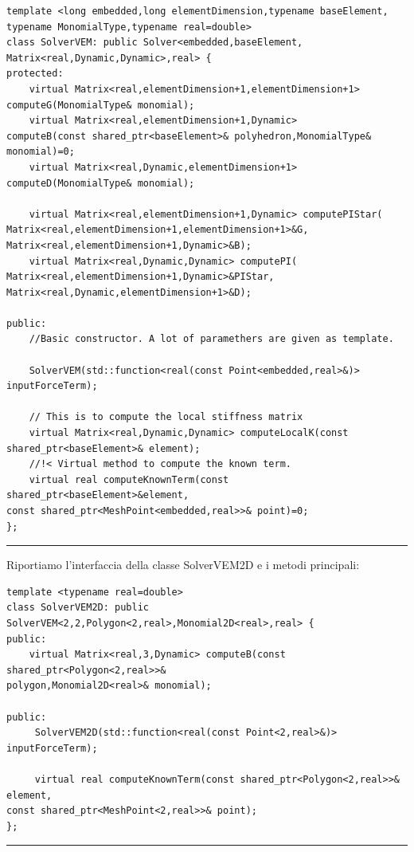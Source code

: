 \documentclass[oneside,12pt]{book}  %
\theoremstyle{plain}
\theoremstyle{definition}
\theoremstyle{remark}
\numberwithin{equation}{chapter} %
\begin{document}
\begin{verbatim}
template <long embedded,long elementDimension,typename baseElement,
typename MonomialType,typename real=double>
class SolverVEM: public Solver<embedded,baseElement,
Matrix<real,Dynamic,Dynamic>,real> {
protected:
    virtual Matrix<real,elementDimension+1,elementDimension+1> 
computeG(MonomialType& monomial);
    virtual Matrix<real,elementDimension+1,Dynamic> 
computeB(const shared_ptr<baseElement>& polyhedron,MonomialType& monomial)=0;
    virtual Matrix<real,Dynamic,elementDimension+1> 
computeD(MonomialType& monomial);
	
    virtual Matrix<real,elementDimension+1,Dynamic> computePIStar(
Matrix<real,elementDimension+1,elementDimension+1>&G,
Matrix<real,elementDimension+1,Dynamic>&B);
    virtual Matrix<real,Dynamic,Dynamic> computePI(
Matrix<real,elementDimension+1,Dynamic>&PIStar,
Matrix<real,Dynamic,elementDimension+1>&D);
	
public:
    //Basic constructor. A lot of paramethers are given as template.

    SolverVEM(std::function<real(const Point<embedded,real>&)> inputForceTerm);
	
    // This is to compute the local stiffness matrix
    virtual Matrix<real,Dynamic,Dynamic> computeLocalK(const
shared_ptr<baseElement>& element); 
    //!< Virtual method to compute the known term.
    virtual real computeKnownTerm(const shared_ptr<baseElement>&element, 
const shared_ptr<MeshPoint<embedded,real>>& point)=0; 
};

\end{verbatim}

\noindent\rule{14cm}{1pt}

Riportiamo l'interfaccia della classe SolverVEM2D e i metodi principali:

\begin{verbatim}
template <typename real=double>
class SolverVEM2D: public SolverVEM<2,2,Polygon<2,real>,Monomial2D<real>,real> {
public:
    virtual Matrix<real,3,Dynamic> computeB(const shared_ptr<Polygon<2,real>>&
polygon,Monomial2D<real>& monomial);

public:
     SolverVEM2D(std::function<real(const Point<2,real>&)> inputForceTerm);
    
     virtual real computeKnownTerm(const shared_ptr<Polygon<2,real>>& element,
const shared_ptr<MeshPoint<2,real>>& point);
};
\end{verbatim}

\noindent\rule{14cm}{1pt}
\end{document}
